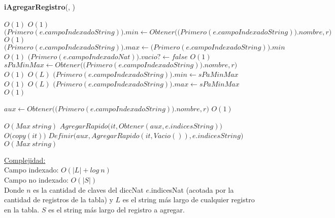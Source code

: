 \begin{Algoritmos}
\begin{algorithm}[H]{\textbf{iAgregarRegistro}(, )}
\begin{algorithmic}
                             \Comment $O(1)$
       \Comment $O(1)$
        \State $\big(Primero(e.campoIndexadoString)\big).min \gets Obtener\big(\big(Primero(e.campoIndexadoString)\big).nombre, r\big)$\\ \Comment $O(1)$
        \State $\big(Primero(e.campoIndexadoString)\big).max \gets \big(Primero(e.campoIndexadoString)\big).min$                                \Comment $O(1)$
        \State $\big(Primero(e.campoIndexadoNat)\big).vacio? \gets false$ \Comment $O(1)$
      \Else
        \State $sPaMinMax \gets Obtener\big(\big(Primero(e.campoIndexadoString)\big).nombre, r\big)$                                               \Comment $O(1)$
                                                                      \Comment $O(L)$
          \State $\big(Primero(e.campoIndexadoString)\big).min \gets sPaMinMax$
                                                                      \Comment $O(1)$
        \EndIf
                                                                      \Comment $O(L)$
          \State $\big(Primero(e.campoIndexadoString)\big).max \gets sPaMinMax$
                                                                      \Comment $O(1)$
        \EndIf
      \EndIf

      \State $aux \gets Obtener\big(\big(Primero(e.campoIndexadoString)\big).nombre, r\big)$                                                              \Comment $O(1)$
      
                                     \Comment $O(Max\ string)$
        \State $AgregarRapido\big(it, Obtener(aux, e.indicesString)\big)$ \Comment $O\big(copy(it)\big)$
      \Else
        \State $Definir\big(aux, AgregarRapido(it, Vacio()), e.indicesString\big)$                                                              \Comment $O(Max\ string)$
      \EndIf
    \EndIf

    \medskip    
    \Statex \underline{Complejidad:} {\\
\quad\quad Campo indexado: $O(|L| +log\ n)$\\
\quad\quad Campo no indexado: $O(|S|)$\\
\quad\quad Donde $n$ es la cantidad de claves del diccNat $e$.indicesNat (acotada por la cantidad de registros de la tabla) y $L$ es el string más largo de cualquier registro en la tabla. $S$ es el string más largo del registro a agregar.
}


\end{algorithmic}
\end{algorithm}
\end{Algoritmos}
